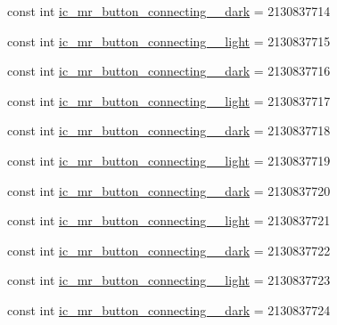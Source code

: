 \begin{DoxyCompactItemize}
const int \mbox{\hyperlink{class_f_w_p_s___app_1_1_droid_1_1_resource_1_1_drawable_aba3b57c7c93b6c464e372239cef0dc57}{ic\+\_\+mr\+\_\+button\+\_\+connecting\+\_\+\_\+dark}} = 2130837714
\item 
const int \mbox{\hyperlink{class_f_w_p_s___app_1_1_droid_1_1_resource_1_1_drawable_a2d9835589108ae06982bf603d20811c0}{ic\+\_\+mr\+\_\+button\+\_\+connecting\+\_\+\_\+light}} = 2130837715
\item 
const int \mbox{\hyperlink{class_f_w_p_s___app_1_1_droid_1_1_resource_1_1_drawable_a215c27306f667a1cd427ede52e6ef189}{ic\+\_\+mr\+\_\+button\+\_\+connecting\+\_\+\_\+dark}} = 2130837716
\item 
const int \mbox{\hyperlink{class_f_w_p_s___app_1_1_droid_1_1_resource_1_1_drawable_a35befae2c6af3ff2e9a3059b4ef86934}{ic\+\_\+mr\+\_\+button\+\_\+connecting\+\_\+\_\+light}} = 2130837717
\item 
const int \mbox{\hyperlink{class_f_w_p_s___app_1_1_droid_1_1_resource_1_1_drawable_a0c991be329d3455b92de12d9cdbccb7b}{ic\+\_\+mr\+\_\+button\+\_\+connecting\+\_\+\_\+dark}} = 2130837718
\item 
const int \mbox{\hyperlink{class_f_w_p_s___app_1_1_droid_1_1_resource_1_1_drawable_ab899d30ffce7bdf164a07db574456c9a}{ic\+\_\+mr\+\_\+button\+\_\+connecting\+\_\+\_\+light}} = 2130837719
\item 
const int \mbox{\hyperlink{class_f_w_p_s___app_1_1_droid_1_1_resource_1_1_drawable_a0454236e913de5de915331d1f99e98b6}{ic\+\_\+mr\+\_\+button\+\_\+connecting\+\_\+\_\+dark}} = 2130837720
\item 
const int \mbox{\hyperlink{class_f_w_p_s___app_1_1_droid_1_1_resource_1_1_drawable_ac3454ff7757b004edd173a86cea6d63a}{ic\+\_\+mr\+\_\+button\+\_\+connecting\+\_\+\_\+light}} = 2130837721
\item 
const int \mbox{\hyperlink{class_f_w_p_s___app_1_1_droid_1_1_resource_1_1_drawable_a9f5f6c7595b3236021dfd6e88c1ed8b4}{ic\+\_\+mr\+\_\+button\+\_\+connecting\+\_\+\_\+dark}} = 2130837722
\item 
const int \mbox{\hyperlink{class_f_w_p_s___app_1_1_droid_1_1_resource_1_1_drawable_ae13ad2c826f8f3da6e5bfb58050872a6}{ic\+\_\+mr\+\_\+button\+\_\+connecting\+\_\+\_\+light}} = 2130837723
\item 
const int \mbox{\hyperlink{class_f_w_p_s___app_1_1_droid_1_1_resource_1_1_drawable_a81e85aab9266ff9bfa940667c15233cb}{ic\+\_\+mr\+\_\+button\+\_\+connecting\+\_\+\_\+dark}} = 2130837724
\item 

\end{DoxyCompactItemize}
